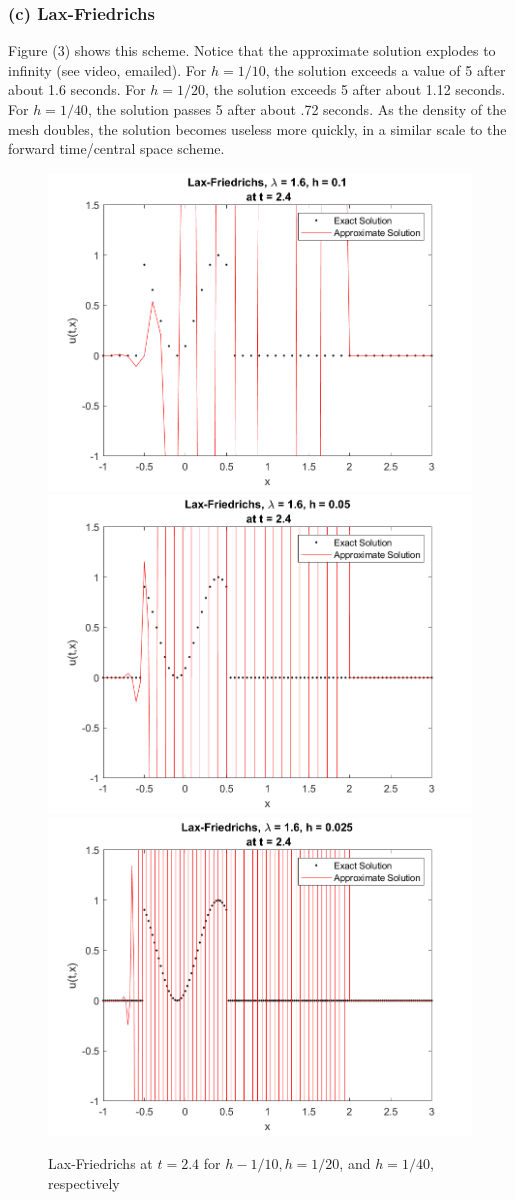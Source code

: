 \documentclass[12pt]{article}
\begin{document}
\subsubsection*{(c) Lax-Friedrichs}

Figure (3) shows this scheme. Notice that the approximate solution explodes to infinity (see video, emailed). For $h=1/10$, the solution exceeds a value of 5 after about 1.6 seconds. For $h=1/20$, the solution exceeds 5 after about 1.12 seconds. For $h=1/40$, the solution passes 5 after about .72 seconds. As the density of the mesh doubles, the solution becomes useless more quickly, in a similar scale to the forward time/central space scheme.

\begin{figure}
	\centering
	\includegraphics[width=.6\linewidth]{./code/c_lax_friedrichs_h_one_10th.png}	\includegraphics[width=.6\linewidth]{./code/c_lax_friedrichs_h_one_20th.png}
	\includegraphics[width=.6\linewidth]{./code/c_lax_friedrichs_h_one_40th.png}
	\caption{Lax-Friedrichs at $t=2.4$ for $h-1/10, h=1/20$, and $h=1/40$, respectively}
\end{figure}
\end{document}

